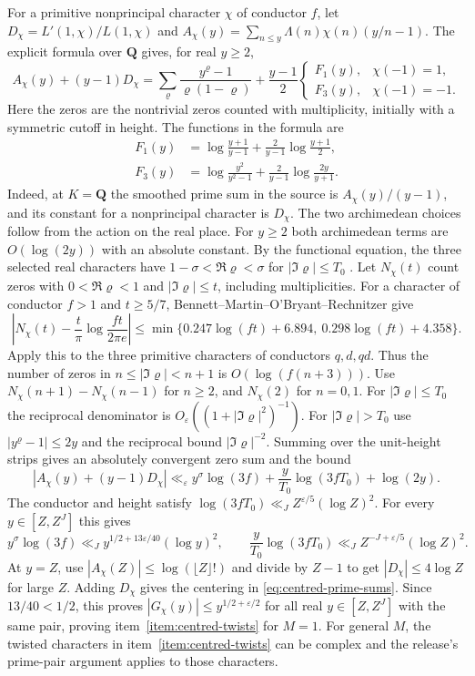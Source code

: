 For a primitive nonprincipal character \(\chi\) of conductor \(f\),
let \(D_\chi=L'(1,\chi)/L(1,\chi)\) and
\(A_\chi(y)=\sum_{n\le y}\Lambda(n)\chi(n)(y/n-1)\).
The explicit formula over \(\mathbf Q\) gives, for real \(y\ge2\),
\[
 A_\chi(y)+(y-1)D_\chi
  =\sum_{\varrho}\frac{y^\varrho-1}{\varrho(1-\varrho)}
    +\frac{y-1}{2}\begin{cases}
         F_1(y), & \chi(-1)=1,\\
         F_3(y), & \chi(-1)=-1 .
       \end{cases}
\]
Here the zeros are the nontrivial zeros counted with multiplicity,
initially with a symmetric cutoff in height. The functions in the
formula are
\[
\begin{aligned}
 F_1(y)&=\log\frac{y+1}{y-1}
                +\frac{2}{y-1}\log\frac{y+1}{2},\\
 F_3(y)&=\log\frac{y^2}{y^2-1}
                +\frac{2}{y-1}\log\frac{2y}{y+1}.
\end{aligned}
\]
Indeed, at \(K=\mathbf Q\) the smoothed prime sum in the source
is \(A_\chi(y)/(y-1)\), and its constant for a nonprincipal
character is \(D_\chi\). The two archimedean choices follow from the
action on the real place. For \(y\ge2\) both archimedean terms are
\(O(\log(2y))\) with an absolute constant.
\cite[\S2.1 and Theorem~1, (2.2.1), pp.~256--257]{f1ihara-murty-shimura}
By the functional equation, the three selected real characters
have \(1-\sigma<\Re\varrho<\sigma\) for \(|\Im\varrho|\le T_0\)
\cite[(25.15.5)]{dlmf}.
Let \(N_\chi(t)\) count zeros with \(0<\Re\varrho<1\) and
\(|\Im\varrho|\le t\), including multiplicities. For a character
of conductor \(f>1\) and \(t\ge5/7\), Bennett--Martin--O'Bryant--Rechnitzer
give
\[
 \left|N_\chi(t)-\frac{t}{\pi}\log\frac{ft}{2\pi e}\right|
 \le \min\{0.247\log(ft)+6.894,\ 0.298\log(ft)+4.358\}.
\]
Apply this to the three primitive characters of conductors \(q,d,qd\).
\cite[Corollary~1.2, p.~1456]{f1bennett-zeros}
Thus the number of zeros in
\(n\le|\Im\varrho|<n+1\) is \(O(\log(f(n+3)))\). Use
\(N_\chi(n+1)-N_\chi(n-1)\) for \(n\ge2\), and \(N_\chi(2)\)
for \(n=0,1\).
For \(|\Im\varrho|\le T_0\) the reciprocal denominator is
\(O_\varepsilon((1+|\Im\varrho|^2)^{-1})\).
For \(|\Im\varrho|>T_0\) use \(|y^\varrho-1|\le2y\) and the
reciprocal bound \(|\Im\varrho|^{-2}\). Summing over the unit-height
strips gives an absolutely convergent zero sum and the bound
\[
 |A_\chi(y)+(y-1)D_\chi|
 \ll_\varepsilon y^\sigma\log(3f)
          +\frac{y}{T_0}\log(3fT_0)+\log(2y).
\]
The conductor and height satisfy
\(\log(3fT_0)\ll_J Z^{\varepsilon/5}(\log Z)^2\). For every
\(y\in[Z,Z^J]\) this gives
\[
 y^\sigma\log(3f)\ll_J y^{1/2+13\varepsilon/40}(\log y)^2,\qquad
  \frac{y}{T_0}\log(3fT_0)\ll_J Z^{-J+\varepsilon/5}(\log Z)^2.
\]
At \(y=Z\), use \(|A_\chi(Z)|\le\log(\lfloor Z\rfloor!)\) and
divide by \(Z-1\) to get \(|D_\chi|\le4\log Z\) for large \(Z\).
Adding \(D_\chi\) gives the centering in \eqref{eq:centred-prime-sums}.
Since \(13/40<1/2\), this proves
\(|G_\chi(y)|\le y^{1/2+\varepsilon/2}\) for all real
\(y\in[Z,Z^J]\) with the same pair, proving
item~\ref{item:centred-twists} for \(M=1\). For general \(M\), the twisted
characters in item~\ref{item:centred-twists} can be complex and
the release's prime-pair argument applies to those characters.

